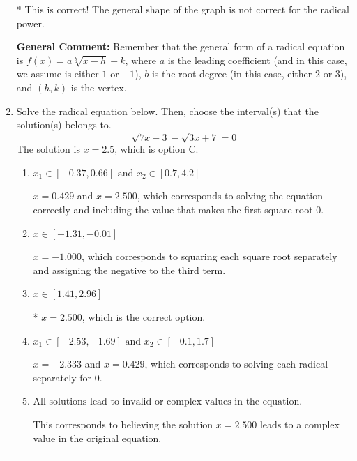 \documentclass{extbook}[14pt]
\newcommand{\litem}[1]{\item #1

\rule{\textwidth}{0.4pt}}
\begin{document}
\begin{enumerate}
{\begin{enumerate}[label=\Alph*.]
* This is correct! The general shape of the graph is not correct for the radical power.
\end{enumerate}

\textbf{General Comment:} Remember that the general form of a radical equation is $ f(x) = a \sqrt[b]{x - h} + k$, where $a$ is the leading coefficient (and in this case, we assume is either $1$ or $-1$), $b$ is the root degree (in this case, either $2$ or $3$), and $(h, k)$ is the vertex.
}
\litem{
Solve the radical equation below. Then, choose the interval(s) that the solution(s) belongs to.
\[ \sqrt{7 x - 3} - \sqrt{3 x + 7} = 0 \]The solution is \( x = 2.5 \), which is option C.\begin{enumerate}[label=\Alph*.]
\item \( x_1 \in [-0.37, 0.66] \text{ and } x_2 \in [0.7,4.2] \)

$x = 0.429$ and $x = 2.500$, which corresponds to solving the equation correctly and including the value that makes the first square root 0.
\item \( x \in [-1.31,-0.01] \)

$x = -1.000$, which corresponds to squaring each square root separately and assigning the negative to the third term.
\item \( x \in [1.41,2.96] \)

* $x = 2.500$, which is the correct option.
\item \( x_1 \in [-2.53, -1.69] \text{ and } x_2 \in [-0.1,1.7] \)

$x = -2.333$ and $x = 0.429$, which corresponds to solving each radical separately for 0.
\item \( \text{All solutions lead to invalid or complex values in the equation.} \)

This corresponds to believing the solution $x = 2.500$ leads to a complex value in the original equation.
\end{enumerate}

}
\end{enumerate}
\end{document}
